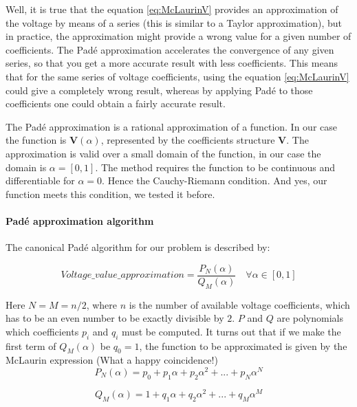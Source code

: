\documentclass[nols,a4paper,twoside,notoc,fleqn]{tufte-book}
\begin{document}
Well, it is true that the equation \ref{eq:McLaurinV} provides an approximation of the voltage by means of a series (this is similar to a Taylor approximation), but in practice, the approximation might provide a wrong value for a given number of coefficients. The Pad\'e approximation accelerates the convergence of any given series, so that you get a more accurate result with less coefficients. This means that for the same series of voltage coefficients, using the equation \ref{eq:McLaurinV} could give a completely wrong result, whereas by applying Pad\'e to those coefficients one could obtain a fairly accurate result.

The Pad\'e approximation is a rational approximation of a function. In our case the function is $\textbf{V}(\alpha)$, represented by the coefficients structure $\textbf{V}$. The approximation is valid over a small domain of the function, in our case the domain is $\alpha=[0,1]$. The method requires the function to be continuous and differentiable for $\alpha=0$. Hence the Cauchy-Riemann condition. And yes, our function meets this condition, we tested it before.

\paragraph{Pad\'e approximation algorithm}

The canonical Pad\'e algorithm for our problem is described by:

\begin{equation}
Voltage\_value\_approximation = \frac{P_N(\alpha)}{Q_M(\alpha)} \quad \forall \alpha \in [0,1]
\label{eq:pade_apprx}
\end{equation}

Here $N=M=n/2$, where $n$ is the number of available voltage coefficients, which has to be an even number to be exactly divisible by $2$. $P$ and $Q$ are polynomials which coefficients $p_i$ and $q_i$ must be computed. It turns out that if we make the first term of $Q_M(\alpha)$ be $q_0=1$, the function to be approximated is given by the McLaurin expression (What a happy coincidence!)
\begin{equation}
P_N(\alpha) = p_0 + p_1\alpha + p_2\alpha^2 + ... + p_N\alpha^N
\end{equation}

\begin{equation}
Q_M(\alpha) = 1 + q_1\alpha + q_2\alpha^2 + ... + q_M\alpha^M
\end{equation}
\end{document}
